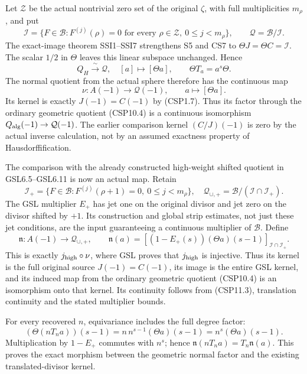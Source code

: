 Let \(\mathscr Z\) be the actual nontrivial zero set of the original
\(\zeta\), with full multiplicities \(m_\rho\), and put \[
\mathcal I=\{F\in\mathcal B:
F^{(j)}(\rho)=0\text{ for every }\rho\in\mathscr Z,\
0\le j<m_\rho\},\qquad
\mathcal Q=\mathcal B/\mathcal I.
\tag{CSP11.9}
\] The exact-image theorem SSI1--SSI7 strengthens S5 and CS7 to
\(\Theta J=\Theta C=\mathcal I\). The scalar \(1/2\) in \(\Theta\)
leaves this linear subspace unchanged. Hence \[
Q_H\xrightarrow{\ \sim\ }\mathcal Q,\quad
[a]\longmapsto[\Theta a],\qquad
\Theta T_a=a^s\Theta.
\tag{CSP11.10}
\] The normal quotient from the actual sphere therefore has the
continuous map \[
\nu:A(-1)\longrightarrow\mathcal Q(-1),\qquad
a\longmapsto[\Theta a].
\tag{CSP11.11}
\] Its kernel is exactly \(J(-1)=C(-1)\) by (CSP1.7). Thus its factor
through the ordinary geometric quotient (CSP10.4) is a continuous
isomorphism \(Q_{\rm alg}(-1)\to\mathcal Q(-1)\). The earlier comparison
kernel \((C/J)(-1)\) is zero by the actual inverse calculation, not by
an assumed exactness property of Hausdorffification.

The comparison with the already constructed high-weight shifted quotient
in GSL6.5--GSL6.11 is now an actual map. Retain \[
\mathcal I_+=\{F\in\mathcal B:
F^{(j)}(\rho+1)=0,\ 0\le j<m_\rho\},\quad
\mathcal Q_{\cup,+}=\mathcal B/(\mathcal I\cap\mathcal I_+).
\] The GSL multiplier \(E_+\) has jet one on the original divisor and
jet zero on the divisor shifted by \(+1\). Its construction and global
strip estimates, not just these jet conditions, are the input
guaranteeing a continuous multiplier of \(\mathcal B\). Define \[
\boxed{
\mathfrak n:A(-1)\longrightarrow\mathcal Q_{\cup,+},\qquad
\mathfrak n(a)=
[(1-E_+(s))(\Theta a)(s-1)]_{\mathcal I\cap\mathcal I_+}.
}
\tag{CSP11.12}
\] This is exactly \(j_{\rm high}\circ\nu\), where GSL proves that
\(j_{\rm high}\) is injective. Thus its kernel is the full original
source \(J(-1)=C(-1)\), its image is the entire GSL kernel, and its
induced map from the ordinary geometric quotient (CSP10.4) is an
isomorphism onto that kernel. Its continuity follows from (CSP11.3),
translation continuity and the stated multiplier bounds.

For every recovered \(n\), equivariance includes the full degree factor:
\[
(\Theta(nT_na))(s-1)
=n\,n^{s-1}(\Theta a)(s-1)
=n^s(\Theta a)(s-1).
\tag{CSP11.13}
\] Multiplication by \(1-E_+\) commutes with \(n^s\); hence
\(\mathfrak n(nT_na)=T_n\mathfrak n(a)\). This proves the exact morphism
between the geometric normal factor and the existing translated-divisor
kernel.

